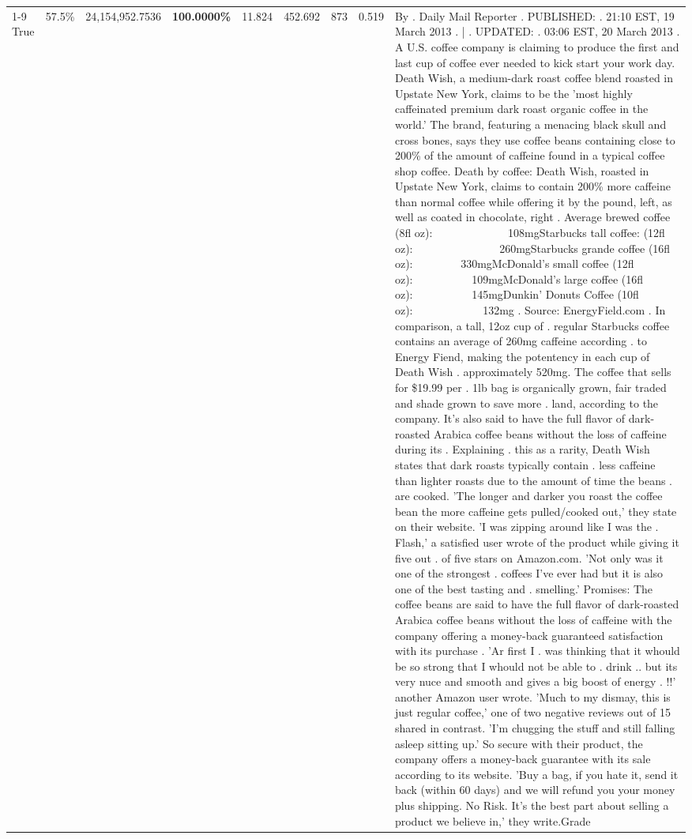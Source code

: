 \begin{table}[H]
{\begin{tabular}{lllrlllll}
\cline{1-9}
True & 57.5\% & 24,154,952.7536 & \bfseries \color{red} 100.0000\% & 11.824 & 452.692 & 873 & 0.519 & By . Daily Mail Reporter . PUBLISHED: . 21:10 EST, 19 March 2013 . | . UPDATED: . 03:06 EST, 20 March 2013 . A U.S. coffee company is claiming to produce the first and last cup of coffee ever needed to kick start your work day. Death Wish, a medium-dark roast coffee blend roasted in Upstate New York, claims to be the 'most highly caffeinated premium dark roast organic coffee in the world.' The brand, featuring a menacing black skull and cross bones, says they use coffee beans containing close to 200\% of the amount of caffeine found in a typical coffee shop coffee. Death by coffee: Death Wish, roasted in Upstate New York, claims to contain 200\% more caffeine than normal coffee while offering it by the pound, left, as well as coated in chocolate, right . Average brewed coffee (8fl oz):              108mgStarbucks tall coffee: (12fl oz):                260mgStarbucks grande coffee (16fl oz):         330mgMcDonald's small coffee (12fl oz):           109mgMcDonald's large coffee (16fl oz):           145mgDunkin' Donuts Coffee (10fl oz):             132mg . Source: EnergyField.com . In comparison, a tall, 12oz cup of . regular Starbucks coffee contains an average of 260mg caffeine according . to Energy Fiend, making the potentency in each cup of Death Wish . approximately 520mg. The coffee that sells for \$19.99 per . 1lb bag is organically grown, fair traded and shade grown to save more . land, according to the company. It's also said to have the full flavor of dark-roasted Arabica coffee beans without the loss of caffeine during its . Explaining . this as a rarity, Death Wish states that dark roasts typically contain . less caffeine than lighter roasts due to the amount of time the beans . are cooked. 'The longer and darker you roast the coffee bean the more caffeine gets pulled/cooked out,' they state on their website. 'I was zipping around like I was the . Flash,' a satisfied user wrote of the product while giving it five out . of five stars on Amazon.com. 'Not only was it one of the strongest . coffees I've ever had but it is also one of the best tasting and . smelling.’ Promises: The coffee beans are said to have the full flavor of dark-roasted Arabica coffee beans without the loss of caffeine with the company offering a money-back guaranteed satisfaction with its purchase . 'Ar first I . was thinking that it whould be so strong that I whould not be able to . drink .. but its very nuce and smooth and gives a big boost of energy . !!' another Amazon user wrote. 'Much to my dismay, this is just regular coffee,' one of two negative reviews out of 15 shared in contrast. 'I'm chugging the stuff and still falling asleep sitting up.' So secure with their product, the company offers a money-back guarantee with its sale according to its website. 'Buy a bag, if you hate it, send it back (within 60 days) and we will refund you your money plus shipping. No Risk. It’s the best part about selling a product we believe in,' they write.Grade \\

\end{tabular}}
\end{table}
